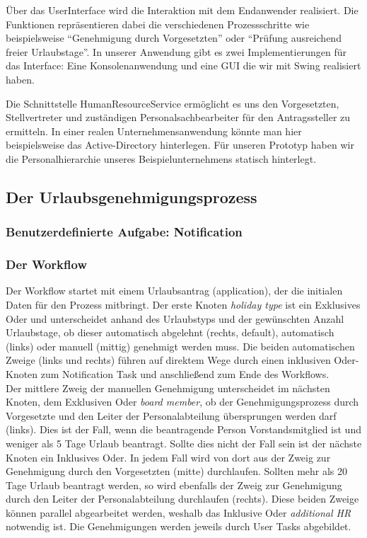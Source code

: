 Über das UserInterface wird die Interaktion mit dem Endanwender realisiert. Die Funktionen repräsentieren dabei die verschiedenen Prozessschritte wie beispielsweise "`Genehmigung durch Vorgesetzten"' oder "`Prüfung ausreichend freier Urlaubstage"'. In unserer Anwendung gibt es zwei Implementierungen für das Interface: Eine Konsolenanwendung und eine GUI die wir mit Swing realisiert haben.

Die Schnittstelle HumanResourceService ermöglicht es uns den Vorgesetzten, Stellvertreter und zuständigen Personalsachbearbeiter für den Antragssteller zu ermitteln. In einer realen Unternehmensanwendung könnte man hier beispielsweise das Active-Directory hinterlegen. Für unseren Prototyp haben wir die Personalhierarchie unseres Beispielunternehmens statisch hinterlegt.

\subsection{Der Urlaubsgenehmigungsprozess}

\subsubsection{Benutzerdefinierte Aufgabe: Notification}

\subsubsection{Der Workflow}
Der Workflow startet mit einem Urlaubsantrag (application), der die initialen Daten für den Prozess mitbringt. Der erste Knoten \textit{holiday type} ist ein Exklusives Oder und unterscheidet anhand des Urlaubstyps und der gewünschten Anzahl Urlaubstage, ob dieser automatisch abgelehnt (rechts, default), automatisch (links) oder manuell (mittig) genehmigt werden muss. Die beiden automatischen Zweige (links und rechts) führen auf direktem Wege durch einen inklusiven Oder-Knoten zum Notification Task und anschließend zum Ende des Workflows.\\
Der mittlere Zweig der manuellen Genehmigung unterscheidet im nächsten Knoten, dem Exklusiven Oder \textit{board member}, ob der Genehmigungsprozess durch Vorgesetzte und den Leiter der Personalabteilung übersprungen werden darf (links). Dies ist der Fall, wenn die beantragende Person Vorstandsmitglied ist und weniger als 5 Tage Urlaub beantragt. Sollte dies nicht der Fall sein ist der nächste Knoten ein Inklusives Oder. In jedem Fall wird von dort aus der Zweig zur Genehmigung durch den Vorgesetzten (mitte) durchlaufen. Sollten mehr als 20 Tage Urlaub beantragt werden, so wird ebenfalls der Zweig zur Genehmigung durch den Leiter der Personalabteilung durchlaufen (rechts). Diese beiden Zweige können parallel abgearbeitet werden, weshalb das Inklusive Oder \textit{additional HR} notwendig ist. Die Genehmigungen werden jeweils durch User Tasks abgebildet.

